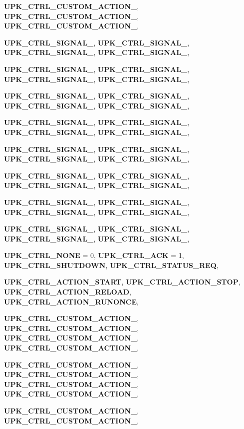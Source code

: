 \begin{DoxyCompactItemize}
{\bf UPK\_\-CTRL\_\-CUSTOM\_\-ACTION\_}, 
{\bf UPK\_\-CTRL\_\-CUSTOM\_\-ACTION\_}, 
{\bf UPK\_\-CTRL\_\-CUSTOM\_\-ACTION\_}, 
\par
{\bf UPK\_\-CTRL\_\-SIGNAL\_}, 
{\bf UPK\_\-CTRL\_\-SIGNAL\_}, 
{\bf UPK\_\-CTRL\_\-SIGNAL\_}, 
{\bf UPK\_\-CTRL\_\-SIGNAL\_}, 
\par
{\bf UPK\_\-CTRL\_\-SIGNAL\_}, 
{\bf UPK\_\-CTRL\_\-SIGNAL\_}, 
{\bf UPK\_\-CTRL\_\-SIGNAL\_}, 
{\bf UPK\_\-CTRL\_\-SIGNAL\_}, 
\par
{\bf UPK\_\-CTRL\_\-SIGNAL\_}, 
{\bf UPK\_\-CTRL\_\-SIGNAL\_}, 
{\bf UPK\_\-CTRL\_\-SIGNAL\_}, 
{\bf UPK\_\-CTRL\_\-SIGNAL\_}, 
\par
{\bf UPK\_\-CTRL\_\-SIGNAL\_}, 
{\bf UPK\_\-CTRL\_\-SIGNAL\_}, 
{\bf UPK\_\-CTRL\_\-SIGNAL\_}, 
{\bf UPK\_\-CTRL\_\-SIGNAL\_}, 
\par
{\bf UPK\_\-CTRL\_\-SIGNAL\_}, 
{\bf UPK\_\-CTRL\_\-SIGNAL\_}, 
{\bf UPK\_\-CTRL\_\-SIGNAL\_}, 
{\bf UPK\_\-CTRL\_\-SIGNAL\_}, 
\par
{\bf UPK\_\-CTRL\_\-SIGNAL\_}, 
{\bf UPK\_\-CTRL\_\-SIGNAL\_}, 
{\bf UPK\_\-CTRL\_\-SIGNAL\_}, 
{\bf UPK\_\-CTRL\_\-SIGNAL\_}, 
\par
{\bf UPK\_\-CTRL\_\-SIGNAL\_}, 
{\bf UPK\_\-CTRL\_\-SIGNAL\_}, 
{\bf UPK\_\-CTRL\_\-SIGNAL\_}, 
{\bf UPK\_\-CTRL\_\-SIGNAL\_}, 
\par
{\bf UPK\_\-CTRL\_\-SIGNAL\_}, 
{\bf UPK\_\-CTRL\_\-SIGNAL\_}, 
{\bf UPK\_\-CTRL\_\-SIGNAL\_}, 
{\bf UPK\_\-CTRL\_\-SIGNAL\_}, 
\par
{\bf UPK\_\-CTRL\_\-NONE} =  0, 
{\bf UPK\_\-CTRL\_\-ACK} =  1, 
{\bf UPK\_\-CTRL\_\-SHUTDOWN}, 
{\bf UPK\_\-CTRL\_\-STATUS\_\-REQ}, 
\par
{\bf UPK\_\-CTRL\_\-ACTION\_\-START}, 
{\bf UPK\_\-CTRL\_\-ACTION\_\-STOP}, 
{\bf UPK\_\-CTRL\_\-ACTION\_\-RELOAD}, 
{\bf UPK\_\-CTRL\_\-ACTION\_\-RUNONCE}, 
\par
{\bf UPK\_\-CTRL\_\-CUSTOM\_\-ACTION\_}, 
{\bf UPK\_\-CTRL\_\-CUSTOM\_\-ACTION\_}, 
{\bf UPK\_\-CTRL\_\-CUSTOM\_\-ACTION\_}, 
{\bf UPK\_\-CTRL\_\-CUSTOM\_\-ACTION\_}, 
\par
{\bf UPK\_\-CTRL\_\-CUSTOM\_\-ACTION\_}, 
{\bf UPK\_\-CTRL\_\-CUSTOM\_\-ACTION\_}, 
{\bf UPK\_\-CTRL\_\-CUSTOM\_\-ACTION\_}, 
{\bf UPK\_\-CTRL\_\-CUSTOM\_\-ACTION\_}, 
\par
{\bf UPK\_\-CTRL\_\-CUSTOM\_\-ACTION\_}, 
{\bf UPK\_\-CTRL\_\-CUSTOM\_\-ACTION\_}, 

\end{DoxyCompactItemize}
